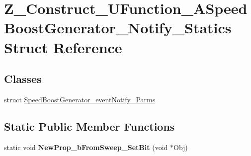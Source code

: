 \hypertarget{struct_z___construct___u_function___a_speed_boost_generator___notify___statics}{}\section{Z\+\_\+\+Construct\+\_\+\+U\+Function\+\_\+\+A\+Speed\+Boost\+Generator\+\_\+\+Notify\+\_\+\+Statics Struct Reference}
\label{struct_z___construct___u_function___a_speed_boost_generator___notify___statics}
\subsection*{Classes}
\begin{DoxyCompactItemize}
\item 
struct \mbox{\hyperlink{struct_z___construct___u_function___a_speed_boost_generator___notify___statics_1_1_speed_boost_generator__event_notify___parms}{Speed\+Boost\+Generator\+\_\+event\+Notify\+\_\+\+Parms}}
\end{DoxyCompactItemize}
\subsection*{Static Public Member Functions}
\begin{DoxyCompactItemize}
\item 
\mbox{\label{struct_z___construct___u_function___a_speed_boost_generator___notify___statics_a8ffebedb6a3bf20cc4e7671bf7011fda}} 
static void {\bfseries New\+Prop\+\_\+b\+From\+Sweep\+\_\+\+Set\+Bit} (void $\ast$Obj)
\end{DoxyCompactItemize}
